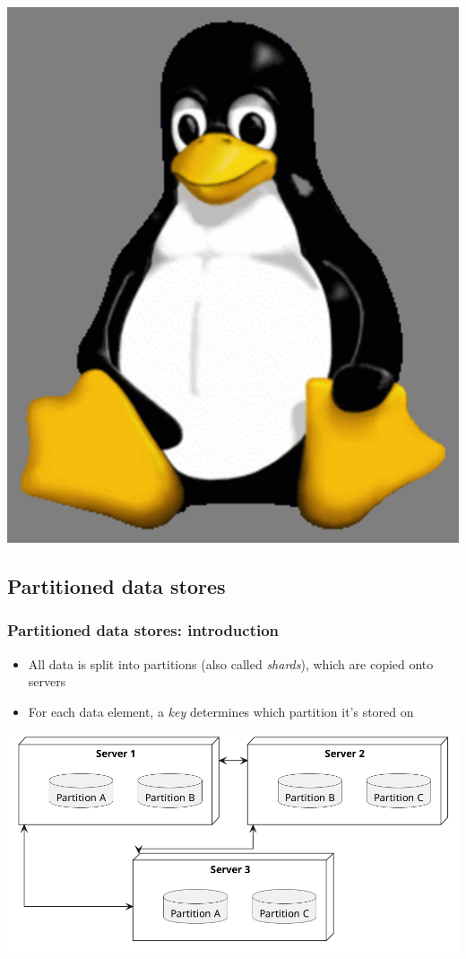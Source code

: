 \documentclass[8pt]{article}
\begin{document}
\begin{center}
\includegraphics[width=.9\linewidth]{graphics/tux.png}
\end{center}
\subsection{Partitioned data stores}
\label{sec:org7c05ee3}
\subsubsection{Partitioned data stores: introduction}
\label{sec:orgaf01aa6}
\begin{itemize}
\item All data is split into partitions (also called \emph{shards}), which are copied onto servers
\item For each data element, a \emph{key} determines which partition it's stored on
\end{itemize}
\begin{center}
\includegraphics[width=.9\linewidth]{graphics/partitioned-data-stores.png}
\end{center}
\end{document}
